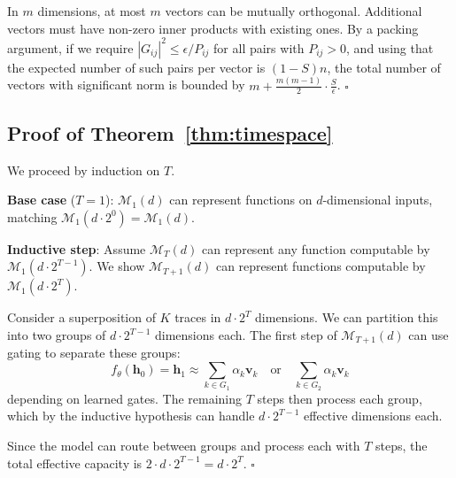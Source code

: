 \documentclass[10pt]{article} %
\theoremstyle{plain}
\theoremstyle{definition}
\theoremstyle{remark}
\begin{document}
In $m$ dimensions, at most $m$ vectors can be mutually orthogonal. Additional vectors must have non-zero inner products with existing ones. By a packing argument, if we require $|G_{ij}|^2 \leq \epsilon / P_{ij}$ for all pairs with $P_{ij} > 0$, and using that the expected number of such pairs per vector is $(1-S)n$, the total number of vectors with significant norm is bounded by $m + \frac{m(m-1)}{2} \cdot \frac{S}{\epsilon}$. $\square$

\subsection{Proof of Theorem~\ref{thm:timespace}}

We proceed by induction on $T$.

\textbf{Base case} ($T=1$): $\mathcal{M}_1(d)$ can represent functions on $d$-dimensional inputs, matching $\mathcal{M}_1(d \cdot 2^0) = \mathcal{M}_1(d)$.

\textbf{Inductive step}: Assume $\mathcal{M}_T(d)$ can represent any function computable by $\mathcal{M}_1(d \cdot 2^{T-1})$. We show $\mathcal{M}_{T+1}(d)$ can represent functions computable by $\mathcal{M}_1(d \cdot 2^T)$.

Consider a superposition of $K$ traces in $d \cdot 2^T$ dimensions. We can partition this into two groups of $d \cdot 2^{T-1}$ dimensions each. The first step of $\mathcal{M}_{T+1}(d)$ can use gating to separate these groups:
\begin{equation}
f_\theta(\mathbf{h}_0) = \mathbf{h}_1 \approx \sum_{k \in G_1} \alpha_k \mathbf{v}_k \quad \text{or} \quad \sum_{k \in G_2} \alpha_k \mathbf{v}_k
\end{equation}
depending on learned gates. The remaining $T$ steps then process each group, which by the inductive hypothesis can handle $d \cdot 2^{T-1}$ effective dimensions each.

Since the model can route between groups and process each with $T$ steps, the total effective capacity is $2 \cdot d \cdot 2^{T-1} = d \cdot 2^T$. $\square$
\end{document}
